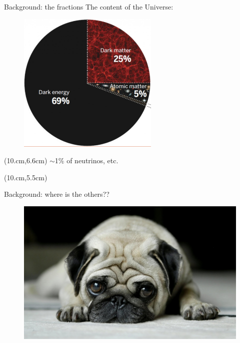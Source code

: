 \documentclass[aspectratio=43]{beamer}
\begin{document}
\begin{frame}{Background: the fractions}
The content of the Universe:
  \begin{figure}
    \includegraphics[width=0.6\textwidth]{fraction.jpg}
  \end{figure}
  \begin{textblock*}{4cm}(10.cm,6.6cm)
    {$\sim$1\% of neutrinos, etc.}
  \end{textblock*}
  \begin{textblock*}{3cm}(10.cm,5.5cm)
    {\color{red}{Stars only account for $\sim$0.07\%}}
  \end{textblock*}
\end{frame}

\begin{frame}{Background: where is the others??}
  \begin{figure}
    \includegraphics[width=\textwidth]{lonely-dog.jpg}
  \end{figure}
\end{frame}
\end{document}
